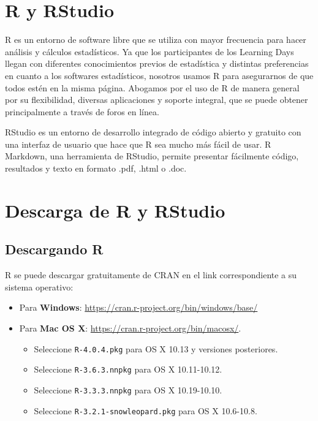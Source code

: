 \documentclass[
  12pt,
  spanish,
]{book}
\providecommand{\tightlist}{%
  \setlength{\itemsep}{0pt}\setlength{\parskip}{0pt}}
\begin{document}
\hypertarget{r-y-rstudio}{%
\section{R y RStudio}\label{r-y-rstudio}}

R es un entorno de software libre que se utiliza con mayor frecuencia para hacer análisis y cálculos estadísticos. Ya que los participantes de los Learning Days llegan con diferentes conocimientos previos de estadística y distintas preferencias en cuanto a los softwares estadísticos, nosotros usamos R para asegurarnos de que todos estén en la misma página. Abogamos por el uso de R de manera general por su flexibilidad, diversas aplicaciones y soporte integral, que se puede obtener principalmente a través de foros en línea.

RStudio es un entorno de desarrollo integrado de código abierto y gratuito con una interfaz de usuario que hace que R sea mucho más fácil de usar. R Markdown, una herramienta de RStudio, permite presentar fácilmente código, resultados y texto en formato .pdf, .html o .doc.

\hypertarget{descarga-de-r-y-rstudio}{%
\section{Descarga de R y RStudio}\label{descarga-de-r-y-rstudio}}

\hypertarget{descargando-r}{%
\subsection{Descargando R}\label{descargando-r}}

R se puede descargar gratuitamente de CRAN en el link correspondiente a su sistema operativo:

\begin{itemize}
\tightlist
\item
  Para \textbf{Windows}: \url{https://cran.r-project.org/bin/windows/base/}
\item
  Para \textbf{Mac OS X}: \url{https://cran.r-project.org/bin/macosx/}.

  \begin{itemize}
  \tightlist
  \item
    Seleccione \texttt{R-4.0.4.pkg} para OS X 10.13 y versiones posteriores.
  \item
    Seleccione \texttt{R-3.6.3.nnpkg} para OS X 10.11-10.12.
  \item
    Seleccione \texttt{R-3.3.3.nnpkg} para OS X 10.19-10.10.
  \item
    Seleccione \texttt{R-3.2.1-snowleopard.pkg} para OS X 10.6-10.8.
  \end{itemize}
\end{itemize}
\end{document}
